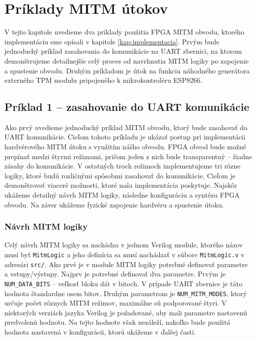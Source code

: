 \chapter{Príklady MITM útokov}
\label{kap:priklady}

V tejto kapitole uvedieme dva príklady použitia FPGA MITM obvodu, ktorého implementáciu sme opísali v kapitole \ref{kap:implementacia}. Prvým bude jednoduchý príklad zasahovania do komunikácie na UART zbernici, na ktorom demonštrujeme detailnejšie celý proces od navrhnutia MITM logiky po zapojenie a spustenie obvodu. Druhým príkladom je útok na funkciu náhodného generátora externého TPM modulu pripojeného k mikrokontroléru ESP8266.

\section{Príklad 1 -- zasahovanie do UART komunikácie} \label{sek:example1}
Ako prvý uvedieme jednoduchý príklad MITM obvodu, ktorý bude zasahovať do UART komunikácie. Cieľom tohoto príkladu je ukázať postup pri implementácii hardvérového MITM útoku s využitím nášho obvodu. FPGA obvod bude možné prepínať medzi štyrmi režimami, pričom jeden z nich bude transparentný -- žiadne zásahy do komunikácie. V ostatných troch režimoch implementujeme tri rôzne logiky, ktoré budú rozličnými spôsobmi zasahovať do komunikácie. Cieľom je demonštrovať viaceré možnosti, ktoré naša implementácia poskytuje. Najskôr ukážeme detailný návrh MITM logiky, následne konfiguráciu a syntézu FPGA obvodu. Na záver ukážeme fyzické zapojenie hardvéru a spustenie útoku.

\subsection{Návrh MITM logiky} \label{subsek:uartMitmLogic}
Celý návrh MITM logiky sa nachádza v jednom Verilog module, ktorého názov musí byť \texttt{MitmLogic} a jeho definícia sa musí nachádzať v súbore \texttt{MitmLogic.v} v adresári \texttt{src/}. Ako prvé je v module MITM logiky potrebné definovať parametre a vstupy/výstupy. Najprv je potrebné definovať dva parametre. Prvým je \texttt{NUM\_DATA\_BITS} -- veľkosť bloku dát v bitoch. V prípade UART zbernice je táto hodnota štandardne osem bitov. Druhým parametrom je \texttt{NUM\_MITM\_MODES}, ktorý určuje počet rôznych MITM režimov, maximálne sú podporované štyri. V niektorých verziách jazyka Verilog je požadované, aby mali parametre nastavenú predvolenú hodnotu. Na tejto hodnote však nezáleží, nakoľko bude použitá hodnota nastavená v konfigurácii, ktorú ukážeme v ďalšej časti.

